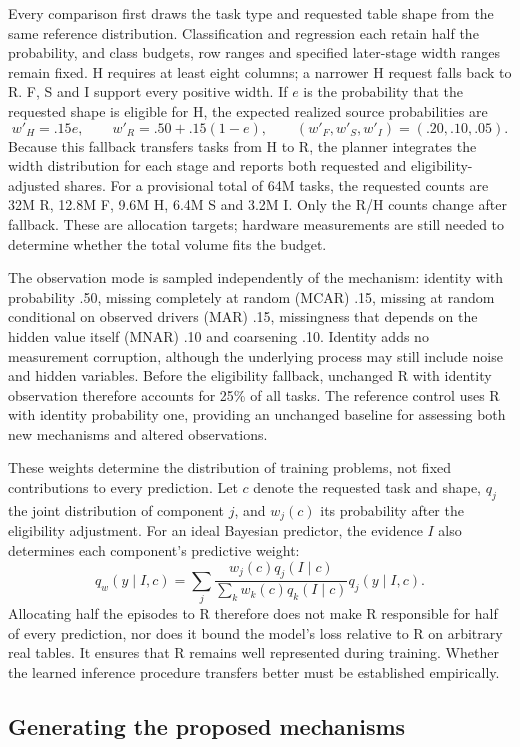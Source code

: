 \documentclass[11pt]{article}
\begin{document}
Every comparison first draws the task type and requested table shape from the same reference distribution. Classification and regression each retain half the probability, and class budgets, row ranges and specified later-stage width ranges remain fixed. H requires at least eight columns; a narrower H request falls back to R. F, S and I support every positive width. If $e$ is the probability that the requested shape is eligible for H, the expected realized source probabilities are
\[
 w'_H=.15e,\qquad w'_R=.50+.15(1-e),
 \qquad (w'_F,w'_S,w'_I)=(.20,.10,.05).
\]
Because this fallback transfers tasks from H to R, the planner integrates the width distribution for each stage and reports both requested and eligibility-adjusted shares. For a provisional total of 64M tasks, the requested counts are 32M R, 12.8M F, 9.6M H, 6.4M S and 3.2M I. Only the R/H counts change after fallback. These are allocation targets; hardware measurements are still needed to determine whether the total volume fits the budget.

The observation mode is sampled independently of the mechanism: identity with probability .50, missing completely at random (MCAR) .15, missing at random conditional on observed drivers (MAR) .15, missingness that depends on the hidden value itself (MNAR) .10 and coarsening .10. Identity adds no measurement corruption, although the underlying process may still include noise and hidden variables. Before the eligibility fallback, unchanged R with identity observation therefore accounts for 25\% of all tasks. The reference control uses R with identity probability one, providing an unchanged baseline for assessing both new mechanisms and altered observations.

These weights determine the distribution of training problems, not fixed contributions to every prediction. Let $c$ denote the requested task and shape, $q_j$ the joint distribution of component $j$, and $w_j(c)$ its probability after the eligibility adjustment. For an ideal Bayesian predictor, the evidence $I$ also determines each component's predictive weight:
\[
 q_w(y\mid I,c)=\sum_j
 \frac{w_j(c)q_j(I\mid c)}{\sum_k w_k(c)q_k(I\mid c)}
 q_j(y\mid I,c).
\]
Allocating half the episodes to R therefore does not make R responsible for half of every prediction, nor does it bound the model's loss relative to R on arbitrary real tables. It ensures that R remains well represented during training. Whether the learned inference procedure transfers better must be established empirically.

\subsection{Generating the proposed mechanisms}
\end{document}
